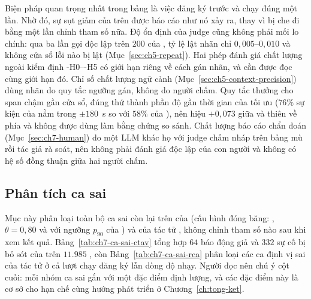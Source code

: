 Biện pháp quan trọng nhất trong bảng là việc đăng ký trước và chạy  đúng một lần. Nhờ đó, sự sụt giảm của \CTAV{} trên  được báo cáo như nó xảy ra, thay vì bị che đi bằng một lần chỉnh tham số nữa. Độ ổn định của judge cũng không phải mối lo chính: qua ba lần gọi độc lập trên $200$  của , tỷ lệ lật nhãn chỉ $0{,}005$--$0{,}010$ và không cửa sổ lỗi nào bị lật (Mục~\ref{sec:ch5-repeat}). %
Hai phép đánh giá chất lượng ngoài kiểm định \hyp{H0}--\hyp{H5} có giới hạn riêng về cách gán nhãn, và cần được đọc cùng giới hạn đó. Chỉ số chất lượng ngữ cảnh (Mục~\ref{sec:ch5-context-precision}) dùng nhãn do quy tắc ngưỡng gán, không do người chấm. Quy tắc thưởng cho span chậm gần cửa sổ, đúng thứ thành phần độ gần thời gian của  tối ưu ($76\%$ sự kiện của  nằm trong $\pm 180$~s so với $58\%$ của ), nên hiệu $+0{,}073$ giữa  và  thiên về phía  và không được dùng làm bằng chứng so sánh. %
Chất lượng báo cáo chẩn đoán (Mục~\ref{sec:ch7-human}) do một LLM khác họ với judge chấm nháp trên bảng mù rồi tác giả rà soát, nên không phải đánh giá độc lập của con người và không có hệ số đồng thuận giữa hai người chấm.

\subsection{Phân tích ca sai}
\label{sec:ch7-ca-sai}

Mục này phân loại toàn bộ ca sai còn lại trên  của \CTAV{} (cấu hình đóng băng: , $\theta = 0{,}80$ và  với ngưỡng $p_{90}$ của ) và của tác tử , không chỉnh tham số nào sau khi xem kết quả. Bảng~\ref{tab:ch7-ca-sai-ctav} tổng hợp $64$ báo động giả và $332$ sự cố bị bỏ sót của \CTAV{} trên $11.985$ , còn Bảng~\ref{tab:ch7-ca-sai-rca} phân loại các ca định vị sai của tác tử  ở cả lượt chạy đăng ký lẫn dòng độ nhạy. Người đọc nên chú ý cột cuối: mỗi nhóm ca sai gắn với một đặc điểm định lượng, và các đặc điểm này là cơ sở cho hạn chế cùng hướng phát triển ở Chương~\ref{ch:tong-ket}.

